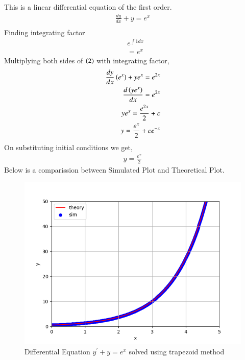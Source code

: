 \documentclass[journal]{IEEEtran}
\begin{document}
This is a linear differential equation of the first order.
\begin{align}
  \frac{dy}{dx} + y = e^x\\
\end{align}
Finding integrating factor 
\begin{align}
  &e^{\int 1dx}\\
  &=e^x
\end{align}
Multiplying both sides of $\left(2\right)$ with integrating factor,
\begin{align}
  \frac{dy}{dx}\left(e^x\right) + ye^x = e^{2x}\\
  \frac{d\left(ye^x\right)}{dx}=e^{2x}\\
  ye^x=\frac{e^{2x}}{2}+c\\
  y=\frac{e^x}{2}+ce^{-x}
\end{align}
On substituting initial conditions we get,
\begin{align}
  y=\frac{e^x}{2}
\end{align}Below is a comparission between Simulated Plot and Theoretical Plot.
\begin{figure}[h!]
   \centering
   \includegraphics[width=1\columnwidth]{figs/fig.png}
   \caption{Differential Equation $y^{\prime}+y=e^x$ solved using trapezoid method}
   \label{stemplot}
\end{figure}
\end{document}
